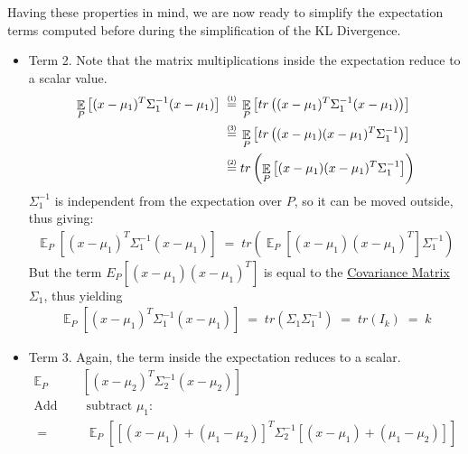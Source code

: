 \documentclass[12pt]{report}
\DeclareMathOperator{\E}{\mathbb{E}}
\newcommand\prone{\mathrel{\overset{\makebox[0pt]
    {\mbox{\normalfont\tiny\sffamily (1)}}}{=}}}
\newcommand\prtwo{\mathrel{\overset{\makebox[0pt]
    {\mbox{\normalfont\tiny\sffamily (2)}}}{=}}}
\newcommand\prthr{\mathrel{\overset{\makebox[0pt]
    {\mbox{\normalfont\tiny\sffamily (3)}}}{=}}}
\begin{document}
\noindent Having these properties in mind, we are now ready to simplify the
expectation terms computed before during the simplification of the KL Divergence.

\begin{itemize}
    \item Term 2. Note that the matrix multiplications inside the expectation reduce
        to a scalar value.
        \begin{align*}
            \E_P \left[ (x-\mu_1)^T\Sigma_1^{-1} (x - \mu_1) \right]
            \;\prone\;& \E_P \left[ tr\left((x-\mu_1)^T\Sigma_1^{-1}
                (x - \mu_1)\right) \right] \\
            \;\prthr\;& \E_P \left[ tr\left( (x - \mu_1)(x - \mu_1)^T
                \Sigma_1^{-1} \right) \right] \\
            \;\prtwo\;& tr\left( \E_P\left[ (x - \mu_1)(x - \mu_1)^T
                \Sigma_1^{-1} \right] \right)
        \end{align*}
        $\Sigma_1^{-1}$ is independent from the expectation over $P$, so it can
        be moved outside, thus giving:
        \begin{align*}
            \E_P \left[ (x-\mu_1)^T\Sigma_1^{-1} (x - \mu_1) \right] \;=\;
                tr\left( \E_P\left[ (x - \mu_1)(x - \mu_1)^T
                    \right] \Sigma_1^{-1} \right)
        \end{align*}
        But the term $E_P\left[ (x - \mu_1)(x - \mu_1)^T \right]$ is equal to the
        \href{https://en.wikipedia.org/wiki/Covariance_matrix#Definition}
        {Covariance Matrix} $\Sigma_1$, thus yielding
        \begin{align}\label{eq:kld_term2}
            \E_P \left[ (x-\mu_1)^T\Sigma_1^{-1} (x - \mu_1) \right]
                \;=\; tr\left( \Sigma_1 \Sigma_1^{-1} \right) \;=\; tr(I_k) \;=\; k
        \end{align}
    \item Term 3. Again, the term inside the expectation reduces to a scalar.
        \begin{align*}
            \E_P &\left[ (x - \mu_2)^T\Sigma_2^{-1} (x - \mu_2) \right] \\[2ex]
            \mbox{Add and}& \mbox{ subtract } \mu_1: \\[2ex]
            \;=&\; \E_P \left[ [(x - \mu_1) + (\mu_1 - \mu_2)]^T\Sigma_2^{-1}
                [(x - \mu_1) + (\mu_1 - \mu_2)] \right] \\[2ex]

\end{align*}
\end{itemize}
\end{document}
